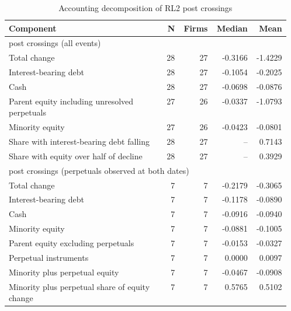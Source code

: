 \begin{table}[!htbp]\centering\scriptsize
\caption{Accounting decomposition of RL2 post crossings }
\begin{threeparttable}
\begin{tabular}{p{0.56\linewidth}rrrr}
\toprule
Component & N & Firms & Median & Mean \\
\midrule
\multicolumn{5}{l}{post crossings (all events)} \\
Total change & 28 & 27 & -0.3166 & -1.4229 \\
Interest-bearing debt & 28 & 27 & -0.1054 & -0.2025 \\
Cash & 28 & 27 & -0.0698 & -0.0876 \\
Parent equity including unresolved perpetuals & 27 & 26 & -0.0337 & -1.0793 \\
Minority equity & 27 & 26 & -0.0423 & -0.0801 \\
Share with interest-bearing debt falling & 28 & 27 & -- & 0.7143 \\
Share with equity over half of decline & 28 & 27 & -- & 0.3929 \\
\multicolumn{5}{l}{post crossings (perpetuals observed at both dates)} \\
Total change & 7 & 7 & -0.2179 & -0.3065 \\
Interest-bearing debt & 7 & 7 & -0.1178 & -0.0890 \\
Cash & 7 & 7 & -0.0916 & -0.0940 \\
Minority equity & 7 & 7 & -0.0881 & -0.1005 \\
Parent equity excluding perpetuals & 7 & 7 & -0.0153 & -0.0327 \\
Perpetual instruments & 7 & 7 & 0.0000 & 0.0097 \\
Minority plus perpetual equity & 7 & 7 & -0.0467 & -0.0908 \\
Minority plus perpetual share of equity change & 7 & 7 & 0.5765 & 0.5102 \\
\bottomrule
\end{tabular}
\begin{tablenotes}[flushleft]\footnotesize

\end{tablenotes}
\end{threeparttable}
\end{table}
